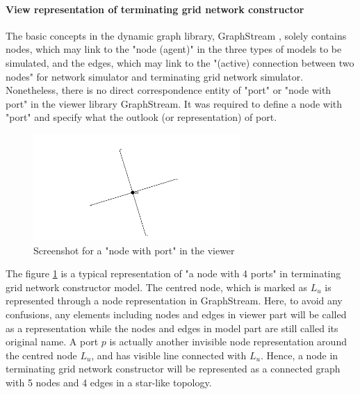 \paragraph{View representation of terminating grid network constructor}
The basic concepts in the dynamic graph library, GraphStream \cite{GraphStream}, solely contains nodes, which may link to the "node (agent)" in
the three types of models to be simulated, and the edges, which may link to the "(active) connection between two nodes" for network simulator and
terminating grid network simulator. Nonetheless, there is no direct correspondence entity of "port" or "node with port" in the viewer library GraphStream.
It was required to define a node with "port" and specify what the outlook (or representation) of port.

\begin{figure}[H]
\begin{center}
\includegraphics[width =0.7\textwidth]{context/diagram/GridNodeRepCapture.png}
\caption{Screenshot for a "node with port" in the viewer}
\label{capture_gridrep}
\end{center}
\end{figure}

\par\noindent
The figure \ref{capture_gridrep} is a typical representation of "a node with 4 ports" in terminating grid network constructor model. The centred node, which
is marked as $L_{u}$ is represented through a node representation in GraphStream. Here, to avoid any confusions, any elements including nodes and edges in
viewer part will be called as a representation while the nodes and edges in model part are still called its original name.
A port $p$ is actually another invisible node representation around the centred node $L_{u}$, and has visible line connected with $L_{u}$. Hence, a node
in terminating grid network constructor will be represented as a connected graph with 5 nodes and 4 edges in a star-like topology.

